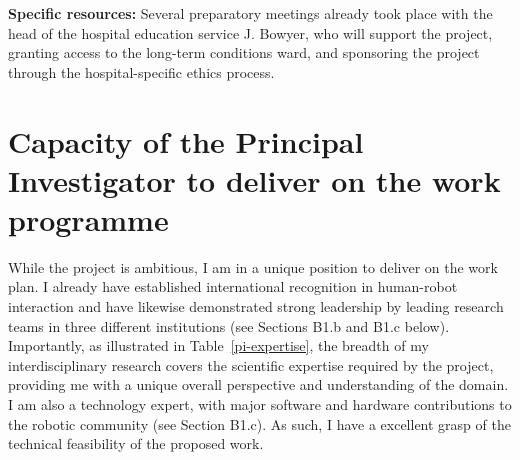\textbf{Specific resources:} Several preparatory meetings already took place
with the head of the hospital education service J. Bowyer, who will support the
project, granting access to the long-term conditions ward, and sponsoring the
project through the hospital-specific ethics process.


\section{Capacity of the Principal Investigator to deliver on the work programme}

While the project is ambitious, I am in a unique position to deliver on the
\project work plan. I already have established international recognition in
human-robot interaction and have likewise demonstrated strong leadership by
leading research teams in three different institutions (see Sections B1.b and
B1.c below). Importantly, as illustrated in Table~\ref{pi-expertise}, the
breadth of my interdisciplinary research covers the scientific expertise
required by the project, providing me with a unique overall perspective and
understanding of the domain. I am also a technology expert, with major software
and hardware contributions to the robotic community (see Section B1.c). As such,
I have a excellent grasp of the technical feasibility of the proposed work.


